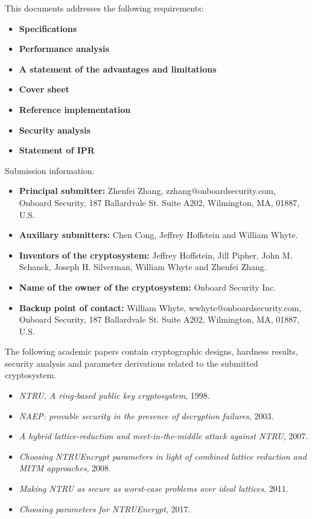 \documentclass{llncs}
\newcommand{\<}{\langle}
\renewcommand{\>}{\rangle}
\begin{document}
\noindent
This documents addresses the following  requirements:

\begin{itemize}
\item {\bf Specifications}
\item {\bf Performance analysis}
\item {\bf A statement of the advantages and limitations}
\item {\bf Cover sheet}
\item {\bf Reference implementation}
\item {\bf Security analysis}
\item {\bf Statement of IPR}
\end{itemize}


\noindent
Submission information:
\begin{itemize}
\item {\bf Principal submitter:} Zhenfei Zhang, zzhang@onboardsecurity.com, Onboard Security, 187 Ballardvale St. Suite A202, Wilmington, MA, 01887, U.S.
\item {\bf Auxiliary submitters:}
Chen Cong, Jeffrey Hoffstein and William Whyte.
\item {\bf 
Inventors of the cryptosystem:} Jeffrey Hoffstein,
               Jill Pipher,
               John M. Schanck,
               Joseph H. Silverman,
               William Whyte and
               Zhenfei Zhang.
\item {\bf Name of the owner of the cryptosystem:} 
Onboard Security Inc.      

\item {\bf Backup point of contact:} William Whyte, wwhyte@onboardsecurity.com, Onboard Security, 187 Ballardvale St. Suite A202, Wilmington, MA, 01887, U.S.
     
\end{itemize}

The following academic papers contain
cryptographic designs, 
hardness results,
security analysis and parameter derivations 
related to the submitted cryptosystem.

\begin{itemize}
\item {\em NTRU, A ring-based public key cryptosystem}, 1998.
\item {\em {NAEP:} provable security in the presence of decryption failures}, 2003.
\item {\em A hybrid lattice-reduction and meet-in-the-middle attack against
  {NTRU}}, 2007.
\item {\em Choosing NTRUEncrypt parameters in light of combined lattice
  reduction and {MITM} approaches}, 2008.
\item {\em Making {NTRU} as secure as worst-case problems over ideal lattices}, 2011.
\item {\em Choosing parameters for NTRUEncrypt}, 2017.

\end{itemize}
\end{document}
